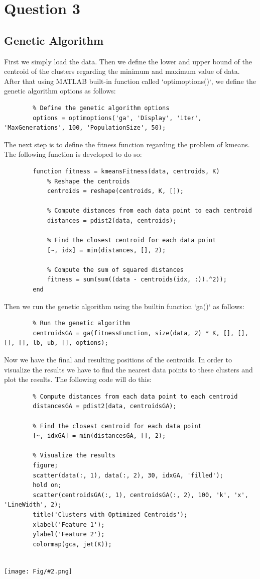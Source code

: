\documentclass[]{article}
\newcommand{\pict}[2]{\begin{center}
		\texttt{[image: Fig/\#2.png]}
\end{center}}
\begin{document}
	\section{Question 3}
	\subsection{Genetic Algorithm}
	First we simply load the data. Then we define the lower and upper bound of the centroid of the clusters regarding the minimum and maximum value of data. After that using MATLAB built-in function called `optimoptions()`, we define the genetic algorithm options as follows:
	\begin{lstlisting}
		% Define the genetic algorithm options
		options = optimoptions('ga', 'Display', 'iter', 'MaxGenerations', 100, 'PopulationSize', 50);
	\end{lstlisting}
	The next step is to define the fitness function regarding the problem of kmeans. The following function is developed to do so:
	\begin{lstlisting}
		function fitness = kmeansFitness(data, centroids, K)
			% Reshape the centroids
			centroids = reshape(centroids, K, []);
			
			% Compute distances from each data point to each centroid
			distances = pdist2(data, centroids);
			
			% Find the closest centroid for each data point
			[~, idx] = min(distances, [], 2);
			
			% Compute the sum of squared distances
			fitness = sum(sum((data - centroids(idx, :)).^2));
		end
	\end{lstlisting}
	Then we run the genetic algorithm using the builtin function `ga()` as follows:
	\begin{lstlisting}
		% Run the genetic algorithm
		centroidsGA = ga(fitnessFunction, size(data, 2) * K, [], [], [], [], lb, ub, [], options);
	\end{lstlisting} 
	Now we have the final and resulting positions of the centroids. In order to visualize the results we have to find the nearest data points to these clusters and plot the results. The following code will do this:
	\begin{lstlisting}
		% Compute distances from each data point to each centroid
		distancesGA = pdist2(data, centroidsGA);
		
		% Find the closest centroid for each data point
		[~, idxGA] = min(distancesGA, [], 2);
		
		% Visualize the results
		figure;
		scatter(data(:, 1), data(:, 2), 30, idxGA, 'filled');
		hold on;
		scatter(centroidsGA(:, 1), centroidsGA(:, 2), 100, 'k', 'x', 'LineWidth', 2);
		title('Clusters with Optimized Centroids');
		xlabel('Feature 1');
		ylabel('Feature 2');
		colormap(gca, jet(K));
		
	\end{lstlisting}
	\pict{0.4}{F20}
	
\end{document}
